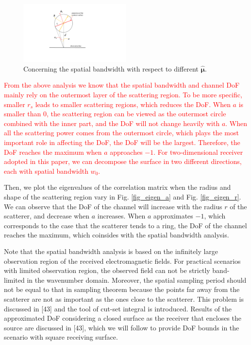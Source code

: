 \documentclass[a4paper,12pt]{article}
\begin{document}
\begin{framed}
\begin{figure}[H]
	\centering 
	\includegraphics[width=0.5\textwidth]{figs/dof_consider_mu.pdf} 
	\caption{\color{red}Concerning the spatial bandwidth with respect to different $\boldsymbol{\hat{\mu}}$.} 
	\label{fig_mu}
\end{figure}

{\textcolor{red}{
From the above analysis we know that the spatial bandwidth and channel DoF mainly rely on the outermost layer of the scattering region. To be more specific, smaller $r_s$ leads to smaller scattering regions, which reduces the DoF. When $a$ is smaller than $0$, the scattering region can be viewed as the outermost circle combined with the inner part, and the DoF will not change heavily with $a$. When all the scattering power comes from the outermost circle, which plays the most important role in affecting the DoF, the DoF will be the largest. Therefore, the DoF reaches the maximum when $a$ approaches $-1$. For two-dimensional receiver adopted in this paper, we can decompose the surface in two different directions, each with spatial bandwidth $w_0$.}
}
    
{\color{red}
    \quad Then, we plot the eigenvalues of the correlation matrix when the radius and shape of the scattering region vary in Fig. \ref{fig_eigen_a} and Fig. \ref{fig_eigen_r}. We can observe that the DoF of the channel will increase with the radius $r$ of the scatterer, and decrease when $a$ increases. When $a$ approximates $-1$, which corresponds to the case that the scatterer tends to a ring, the DoF of the channel reaches the maximum, which coinsides with the spatial bandwidth analysis.
    
    \quad Note that the spatial bandwidth analysis is based on the infinitely large observation region of the received electromagnetic fields. For practical scenarios with limited observation region, the observed field can not be strictly band-limited in the wavenumber domain. Moreover, the spatial sampling period should not be equal to that in sampling theorem because the points far away from the scatterer are not as important as the ones close to the scatterer. This problem is discussed in [43] and the tool of cut-set integral is introduced. Results of the approximated DoF considering a closed surface as the receiver that encloses the source are discussed in [43], which we will follow to provide DoF bounds in the scenario with square receiving surface. 
    
}
\end{framed}
\end{document}
